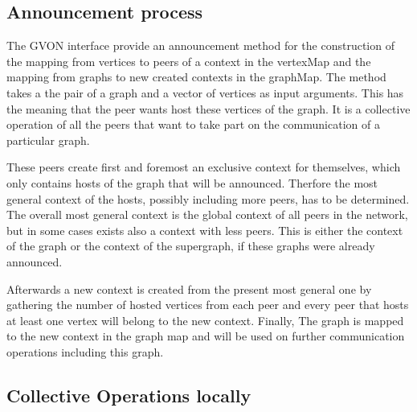 \subsection{Announcement process}
\label{sec:announcement_impl}

The GVON interface provide an announcement method for the construction
of the mapping from vertices to peers of a context in the vertexMap
and the mapping from graphs to new created contexts in the graphMap.
The method takes a the pair of a graph and a vector of vertices as
input arguments. This has the meaning that the peer wants host these
vertices of the graph.  It is a collective operation of all the peers
that want to take part on the communication of a particular graph.

These peers create first and foremost an exclusive context for
themselves, which only contains hosts of the graph that will be
announced.  Therfore the most general context of the hosts, possibly
including more peers, has to be determined.  The overall most general
context is the global context of all peers in the network, but in some
cases exists also a context with less peers.  This is either the
context of the graph or the context of the supergraph, if these graphs
were already announced.

Afterwards a new context is created from the present most general one
by gathering the number of hosted vertices from each peer and every
peer that hosts at least one vertex will belong to the new context.
Finally, The graph is mapped to the new context in the graph map and
will be used on further communication operations including this graph.


\subsection{Collective Operations locally}
\label{sec:gvon_collective}

